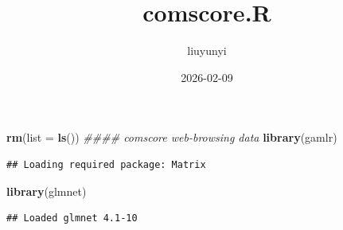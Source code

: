 \documentclass[
]{article}
\title{comscore.R}
\author{liuyunyi}
\date{2026-02-09}
\newenvironment{Shaded}{\begin{snugshade}}{\end{snugshade}}
\newcommand{\AttributeTok}[1]{\textcolor[rgb]{0.13,0.29,0.53}{#1}}
\newcommand{\DecValTok}[1]{\textcolor[rgb]{0.00,0.00,0.81}{#1}}
\newcommand{\DocumentationTok}[1]{\textcolor[rgb]{0.56,0.35,0.01}{\textit{#1}}}
\newcommand{\FunctionTok}[1]{\textcolor[rgb]{0.13,0.29,0.53}{\textbf{#1}}}
\newcommand{\NormalTok}[1]{#1}
\newcommand{\OtherTok}[1]{\textcolor[rgb]{0.56,0.35,0.01}{#1}}
\newcommand{\SpecialCharTok}[1]{\textcolor[rgb]{0.81,0.36,0.00}{\textbf{#1}}}
\newcommand{\StringTok}[1]{\textcolor[rgb]{0.31,0.60,0.02}{#1}}
\begin{document}
\maketitle

\begin{Shaded}
\begin{Highlighting}[]
\FunctionTok{rm}\NormalTok{(}\AttributeTok{list =} \FunctionTok{ls}\NormalTok{())}
\DocumentationTok{\#\#\#\# comscore web{-}browsing data}
\FunctionTok{library}\NormalTok{(gamlr)}
\end{Highlighting}
\end{Shaded}

\begin{verbatim}
## Loading required package: Matrix
\end{verbatim}

\begin{Shaded}
\begin{Highlighting}[]
\FunctionTok{library}\NormalTok{(glmnet)}
\end{Highlighting}
\end{Shaded}

\begin{verbatim}
## Loaded glmnet 4.1-10
\end{verbatim}

\begin{Shaded}
\end{Shaded}
\end{document}
